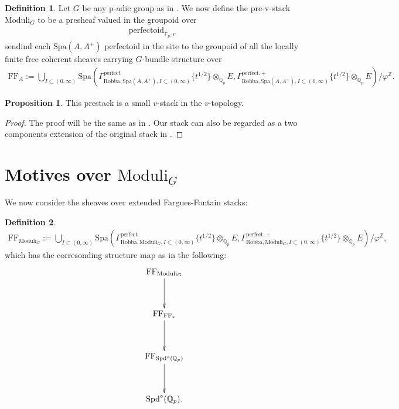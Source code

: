 \documentclass[12pt]{book}
\theoremstyle{definition}
\newtheorem{proposition}{Proposition}
\newtheorem{definition}{Definition}
\begin{document}
\begin{definition}
Let $G$ be any p-adic group as in \cite{FS}. We now define the pre-v-stack $\text{Moduli}_G$ to be a presheaf valued in the groupoid over
\begin{align}
\text{perfectoid}_{\overline{\mathbb{F}}_p,v} 
\end{align}
sendind each $\mathrm{Spa}(A,A^+)$ perfectoid in the site to the groupoid of all the locally finite free coherent sheaves carrying $G$-bundle structure over  
\begin{align}
\mathrm{FF}_A:=\bigcup_{I\subset (0,\infty)}\mathrm{Spa}(\Gamma^\text{perfect}_{\text{Robba},\mathrm{Spa}(A,A^+),I\subset (0,\infty)}\{t^{1/2}\}\otimes_{\mathbb{Q}_p}E,\Gamma^{\text{perfect},+}_{\text{Robba},\mathrm{Spa}(A,A^+),I\subset (0,\infty)}\{t^{1/2}\}\otimes_{\mathbb{Q}_p}E)/\varphi^\mathbb{Z}.
\end{align}
\end{definition}

\begin{proposition}
This prestack is a small $v$-stack in the $v$-topology.
\end{proposition}

\begin{proof}
The proof will be the same as in \cite[Proposition III.1.3]{FS}. Our stack can also be regarded as a two components extension of the original stack in \cite{FS}.  
\end{proof}



\section{Motives over $\mathrm{Moduli}_G$}

\noindent We now consider the sheaves over extended Fargues-Fontain stacks:

\begin{definition}
\begin{align}
\mathrm{FF}_{\mathrm{Moduli}_G}:=\bigcup_{I\subset (0,\infty)}\mathrm{Spa}(\Gamma^\text{perfect}_{\text{Robba},{\mathrm{Moduli}_G},I\subset (0,\infty)}\{t^{1/2}\}\otimes_{\mathbb{Q}_p}E,\Gamma^{\text{perfect},+}_{\text{Robba},{\mathrm{Moduli}_G},I\subset (0,\infty)}\{t^{1/2}\}\otimes_{\mathbb{Q}_p}E)/\varphi^\mathbb{Z},
\end{align}
which has the corresonding structure map as in the following:
\[\displayindent=-0.4in
\xymatrix@R+1pc{
&\mathrm{FF}_{\mathrm{Moduli}_G} \ar[d]  \\
&\mathrm{FF}_{\mathrm{FF}_*} \ar[d]\\
&\mathrm{FF}_{\mathrm{Spd}^\diamond(\mathbb{Q}_p)} \ar[d]\\
& \mathrm{Spd}^\diamond(\mathbb{Q}_p).  
}
\]
\end{definition}
\end{document}
